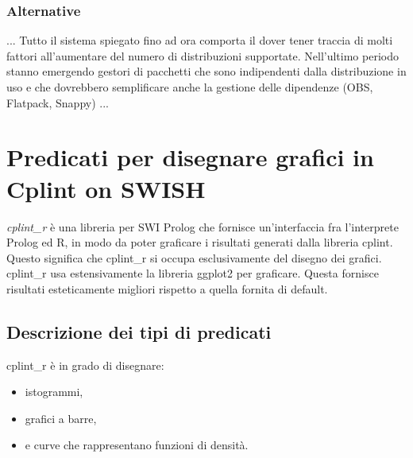 \documentclass[10pt,titlepage,twoside,a4paper]{report}
\begin{document}
\subsection{Alternative}
... Tutto il sistema spiegato fino ad ora comporta il dover tener traccia di 
molti fattori all'aumentare del numero di distribuzioni supportate. Nell'ultimo 
periodo stanno emergendo gestori di pacchetti che sono indipendenti dalla 
distribuzione in uso e che dovrebbero semplificare anche la gestione delle 
dipendenze (OBS, Flatpack, Snappy) ...




\chapter{Predicati per disegnare grafici in Cplint on SWISH} 
\label{predicati-per-disegnare-grafici-in-cplint-on-swish}
\emph{cplint\_r} è una libreria per SWI Prolog che fornisce un'interfaccia 
fra l'interprete Prolog ed R, in modo da poter graficare i risultati generati 
dalla libreria cplint. Questo significa che cplint\_r si occupa esclusivamente 
del disegno dei grafici. cplint\_r usa estensivamente la libreria ggplot2 per 
graficare. Questa fornisce risultati esteticamente migliori rispetto a quella 
fornita di default.

\section{Descrizione dei tipi di predicati}
cplint\_r è in grado di disegnare:
\begin{itemize}
    \item istogrammi,
    \item grafici a barre,
    \item e curve che rappresentano funzioni di densità.
\end{itemize}
\end{document}
